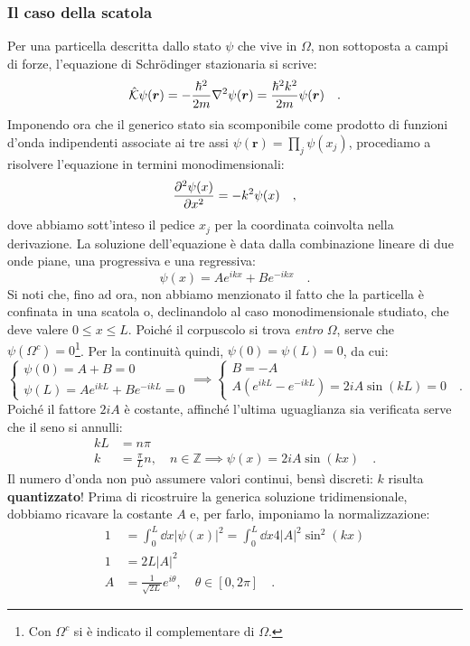 \subsubsection{Il caso della scatola}
Per una particella descritta dallo stato $\psi$ che vive in $\Omega$, non sottoposta a campi di forze, l'equazione di Schrödinger stazionaria si scrive:
\[
    \hat{\mathcal{K}} \psi(\bm{r}) = -\frac{\hbar^2}{2m} \nabla^2 \psi(\bm{r}) = \frac{\hbar^2 k^2}{2m} \psi(\bm{r}) \quad.
\]
Imponendo ora che il generico stato sia scomponibile come prodotto di funzioni d'onda indipendenti associate ai tre assi $\psi(\bm{r}) = \prod_j \psi(x_j)$, procediamo a risolvere l'equazione in termini monodimensionali:
\[
    \pdv[2]{\psi(x)}{x} = -k^2 \psi(x) \quad,
\]
dove abbiamo sott'inteso il pedice $x_j$ per la coordinata coinvolta nella derivazione. La soluzione dell'equazione è data dalla combinazione lineare di due onde piane, una progressiva e una regressiva:
\[
    \psi(x) = Ae^{ikx} + Be^{-ikx} \quad.
\]
Si noti che, fino ad ora, non abbiamo menzionato il fatto che la particella è confinata in una scatola o, declinandolo al caso monodimensionale studiato, che deve valere $0 \leq x \leq L$. Poiché il corpuscolo si trova \emph{entro} $\Omega$, serve che $\psi(\Omega^c) = 0$\footnote{Con $\Omega^c$ si è indicato il complementare di $\Omega$.}. Per la continuità quindi, $\psi(0) = \psi(L) = 0$, da cui:
\[
    \begin{cases}
        \psi(0) = A + B = 0 \\
        \psi(L) = Ae^{ikL} + Be^{-ikL} = 0
    \end{cases}
    \implies
    \begin{cases}
        B = -A \\
        A(e^{ikL} - e^{-ikL}) = 2i A \sin(kL) = 0 \quad.
    \end{cases}
\] 
Poiché il fattore $2iA$ è costante, affinché l'ultima uguaglianza sia verificata serve che il seno si annulli:
\[
\begin{aligned}
    kL &= n \pi \\
    k &= \frac{\pi}{L} n, \quad n \in \mathbb{Z} \implies \psi(x) = 2iA \sin(kx) \quad.
\end{aligned}
\]
Il numero d'onda non può assumere valori continui, bensì discreti: $k$ risulta \textbf{quantizzato}! Prima di ricostruire la generica soluzione tridimensionale, dobbiamo ricavare la costante $A$ e, per farlo, imponiamo la normalizzazione:
\[
\begin{aligned}
    1 &= \int_0^L \dd{x} |\psi(x)|^2 = \int_0^{L} \dd{x} 4|A|^2 \sin^2(kx)  \\
    1 &= 2L|A|^2 \\
    A &= \frac{1}{\sqrt{2L}} e^{i\theta}, \quad \theta \in [0, 2\pi] \quad.
\end{aligned}
\]
